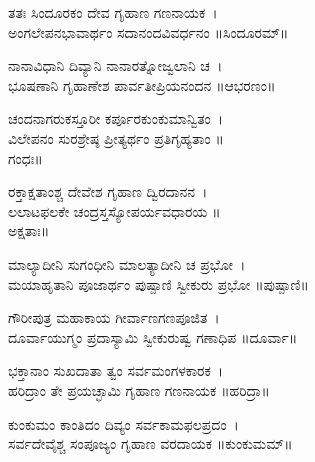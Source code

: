 ತತಃ ಸಿಂದೂರಕಂ ದೇವ ಗೃಹಾಣ ಗಣನಾಯಕ~।\\
ಅಂಗಲೇಪನಭಾವಾರ್ಥಂ ಸದಾನಂದವಿವರ್ಧನಂ ॥ಸಿಂದೂರಮ್॥

ನಾನಾವಿಧಾನಿ ದಿವ್ಯಾನಿ ನಾನಾರತ್ನೋಜ್ವಲಾನಿ ಚ~।\\
ಭೂಷಣಾನಿ ಗೃಹಾಣೇಶ ಪಾರ್ವತೀಪ್ರಿಯನಂದನ ॥ಆಭರಣಂ॥

ಚಂದನಾಗರುಕಸ್ತೂರೀ ಕರ್ಪೂರಕುಂಕುಮಾನ್ವಿತಂ~।\\
ವಿಲೇಪನಂ ಸುರಶ್ರೇಷ್ಠ ಪ್ರೀತ್ಯರ್ಥಂ ಪ್ರತಿಗೃಹ್ಯತಾಂ ॥\\
ಗಂಧಃ॥

ರಕ್ತಾಕ್ಷತಾಂಶ್ಚ ದೇವೇಶ ಗೃಹಾಣ ದ್ವಿರದಾನನ~।\\
ಲಲಾಟಫಲಕೇ ಚಂದ್ರಸ್ತಸ್ಯೋಪರ್ಯವಧಾರಯ ॥\\
ಅಕ್ಷತಾಃ॥


ಮಾಲ್ಯಾದೀನಿ ಸುಗಂಧೀನಿ ಮಾಲತ್ಯಾದೀನಿ ಚ ಪ್ರಭೋ~।\\
ಮಯಾಹೃತಾನಿ ಪೂಜಾರ್ಥಂ ಪುಷ್ಪಾಣಿ ಸ್ವೀಕುರು ಪ್ರಭೋ ॥ಪುಷ್ಪಾಣಿ॥

ಗೌರೀಪುತ್ರ ಮಹಾಕಾಯ ಗೀರ್ವಾಣಗಣಪೂಜಿತ~।\\
ದೂರ್ವಾಯುಗ್ಮಂ ಪ್ರದಾಸ್ಯಾಮಿ ಸ್ವೀಕುರುಷ್ವ ಗಣಾಧಿಪ ॥ದೂರ್ವಾ॥

ಭಕ್ತಾನಾಂ ಸುಖದಾತಾ ತ್ವಂ ಸರ್ವಮಂಗಳಕಾರಕ~।\\
ಹರಿದ್ರಾಂ ತೇ ಪ್ರಯಚ್ಛಾಮಿ ಗೃಹಾಣ ಗಣನಾಯಕ ॥ಹರಿದ್ರಾ॥

ಕುಂಕುಮಂ ಕಾಂತಿದಂ ದಿವ್ಯಂ ಸರ್ವಕಾಮಫಲಪ್ರದಂ~।\\
ಸರ್ವದೇವೈಶ್ಚ ಸಂಪೂಜ್ಯಂ ಗೃಹಾಣ ವರದಾಯಕ ॥ಕುಂಕುಮಮ್॥


